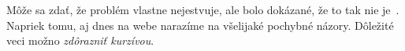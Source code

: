 \documentclass[10pt,twoside,slovak,a4paper]{article}
\begin{document}
Môže sa zdať, že problém vlastne nejestvuje\cite{Coplien:MPD}, ale bolo dokázané, že to tak nie je~\cite{Czarnecki:Staged, Czarnecki:Progress}. Napriek tomu, aj dnes na webe narazíme na všelijaké pochybné názory\cite{PLP-Framework}. Dôležité veci možno \emph{zdôrazniť kurzívou}.









\end{document}
